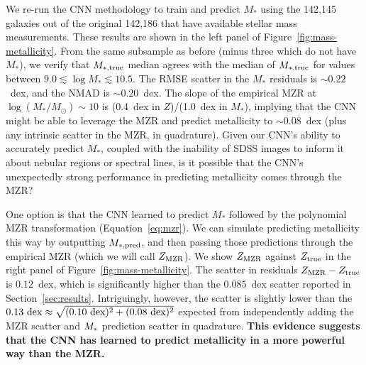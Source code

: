 \documentclass[fleqn,usenatbib]{mnras}
\begin{document}
We re-run the CNN methodology to train and predict $M_{\ast}$ using the 142,145 galaxies out of the original 142,186 that have available stellar mass measurements.
These results are shown in the left panel of Figure~\ref{fig:mass-metallicity}.
From the same subsample as before (minus three which do not have $M_{\ast}$), we verify that $M_{\rm \ast, true}$ median agrees with the median of $M_{\rm \ast, true}$ for values between $9.0 \lesssim \log M_\ast \lesssim 10.5$. 
The RMSE scatter in the $M_{\ast}$ residuals is $\sim 0.22$~dex, and the NMAD is $\sim 0.20$~dex.
The slope of the empirical MZR at $\log (M_\ast / M_\odot) \sim 10$ is (0.4~dex in $Z$)/(1.0~dex in $M_{\ast}$), implying that the CNN might be able to leverage the MZR and predict metallicity to $\sim 0.08$~dex (plus any intrinsic scatter in the MZR, in quadrature).
Given our CNN's ability to accurately predict $M_{\ast}$, coupled with the inability of SDSS images to inform it about nebular regions or spectral lines, is it possible that the CNN's unexpectedly strong performance in predicting metallicity comes through the MZR?

One option is that the CNN learned to predict $M_{\ast}$ followed by the polynomial MZR transformation (Equation~\ref{eq:mzr}).
We can simulate predicting metallicity this way by outputting $M_{\rm \ast, pred}$, and then passing those predictions through the empirical MZR (which we will call $Z_{\rm MZR}$).
We show $Z_{\rm MZR}$ against $Z_{\rm true}$ in the right panel of Figure~\ref{fig:mass-metallicity}.
The scatter in residuals $Z_{\rm MZR} - Z_{\rm true}$ is $0.12$~dex, which is significantly higher than the $0.085$~dex scatter reported in Section~\ref{sec:results}.
Intriguingly, however, the scatter is slightly lower than the $0.13{\rm ~ dex} \approx \sqrt{\rm (0.10~dex)^2 + (0.08~dex)^2}$ expected from independently adding the MZR scatter and $M_{\rm \ast}$ prediction scatter in quadrature.
\textbf{This evidence suggests that the CNN has learned to predict metallicity in a more powerful way than the MZR.}
\end{document}
